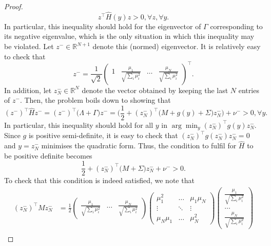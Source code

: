 \documentclass{article}
\begin{document}
\begin{proof}
\begin{equation*}
z^\top \hat{H}(y) z > 0, \forall z, \forall y.
\end{equation*}
In particular, this inequality should hold for the eigenvector of $\Gamma$ corresponding to its negative eigenvalue, which is the only situation in which this inequality may be violated. Let $z^- \in \mathbb{R}^{N+1}$ denote this (normed) eigenvector. It is relatively easy to check that
\begin{equation*}
z^- = \frac{1}{\sqrt{2}}\begin{pmatrix} 1 & \frac{\mu_1}{\sqrt{\sum_i \mu_i^2}} & \ldots & \frac{\mu_N}{\sqrt{\sum_i \mu_i^2}}\end{pmatrix}^\top.
\end{equation*}
In addition, let $z_N^- \in \mathbb{R}^N$ denote the vector obtained by keeping the last $N$ entries of $z^-$. Then, the problem boils down to showing that
\begin{equation*}
(z^-)^\top \hat{H} z^- = (z^-)^\top\big(\Lambda + \Gamma\big) z^- = \Big(\frac{1}{2} + (z_N^-)^\top\big(M + g(y) + \Sigma\big)z_N^-\Big) + \nu^- > 0, \forall y.
\end{equation*}
In particular, this inequality should hold for all $y$ in $\arg \min_y (z_N^-)^\top g(y) z_N^-$. Since $g$ is positive semi-definite, it is easy to check that $(z_N^-)^\top g(z_N^-) z_N^- = 0$ and $y = z_N^-$ minimises the quadratic form. Thus, the condition to fulfil for $\hat{H}$ to be positive definite becomes
\begin{equation*}
\frac{1}{2} + (z_N^-)^\top\big(M + \Sigma\big)z_N^- + \nu^- > 0.
\end{equation*}
To check that this condition is indeed satisfied, we note that
\begin{align*}
(z_N^-)^\top M z_N^- &= \frac{1}{2}\begin{pmatrix} \frac{\mu_1}{\sqrt{\sum_i \mu_i^2}} & \ldots & \frac{\mu_N}{\sqrt{\sum_i \mu_i^2}}\end{pmatrix} \begin{pmatrix} \mu_1^2 & \ldots & \mu_1 \mu_N \\ \vdots & \ddots & \vdots \\ \mu_N \mu_1 & \ldots & \mu_N^2 \end{pmatrix} \begin{pmatrix} \frac{\mu_1}{\sqrt{\sum_i \mu_i^2}} \\ \ldots \\ \frac{\mu_N}{\sqrt{\sum_i \mu_i^2}}\end{pmatrix}\\

\end{align*}
\end{proof}
\end{document}
